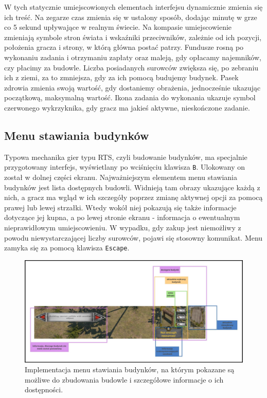 W tych statycznie umiejscowionych elementach interfejsu dynamicznie zmienia się ich treść. Na zegarze czas zmienia się w ustalony sposób,
dodając minutę w grze co 5 sekund upływające w realnym świecie. Na kompasie umiejscowienie zmieniają symbole stron świata i wskaźniki przeciwników,
zależnie od ich pozycji, położenia gracza i strony, w którą główna postać patrzy. Fundusze rosną po wykonaniu zadania i otrzymaniu zapłaty oraz maleją, gdy opłacamy
najemników, czy płacimy za budowle. Liczba posiadanych surowców zwiększa się, po zebraniu ich z ziemi, za to zmniejsza, gdy za ich pomocą budujemy budynek.  
Pasek zdrowia zmienia swoją wartość, gdy dostaniemy obrażenia, jednocześnie ukazując początkową, maksymalną wartość. Ikona zadania do wykonania ukazuje symbol 
czerwonego wykrzyknika, gdy gracz ma jakieś aktywne, nieskończone zadanie.

\subsection{Menu stawiania budynków}
Typowa mechanika gier typu RTS, czyli budowanie budynków, ma specjalnie przygotowany interfejs, wyświetlany po wciśnięciu klawisza \texttt{B}.
Ulokowany on został w dolnej części ekranu. Najważniejszym elementem menu stawiania budynków jest lista dostępnych budowli. Widnieją tam 
obrazy ukazujące każdą z nich, a gracz ma wgląd w ich szczegóły poprzez zmianę aktywnej opcji za pomocą prawej lub lewej strzałki. Wtedy wokół niej pokazują się także informacje dotyczące jej kupna,
a po lewej stronie ekranu - informacja o ewentualnym nieprawidłowym umiejscowieniu. W wypadku, gdy zakup jest niemożliwy z powodu niewystarczającej liczby 
surowców, pojawi się stosowny komunikat. Menu zamyka się za pomocą klawisza \texttt{Escape}.
\begin{figure}[htbp]
    \centering
    \includegraphics[width=1.0\textwidth]{images/ui/opis_ekementow_budowanie.png}
    \caption{Implementacja menu stawiania budynków, na którym pokazane są możliwe do zbudowania budowle 
    i szczegółowe informacje o ich dostępności.
    }\label{fig:compass}
\end{figure}
\FloatBarrier

